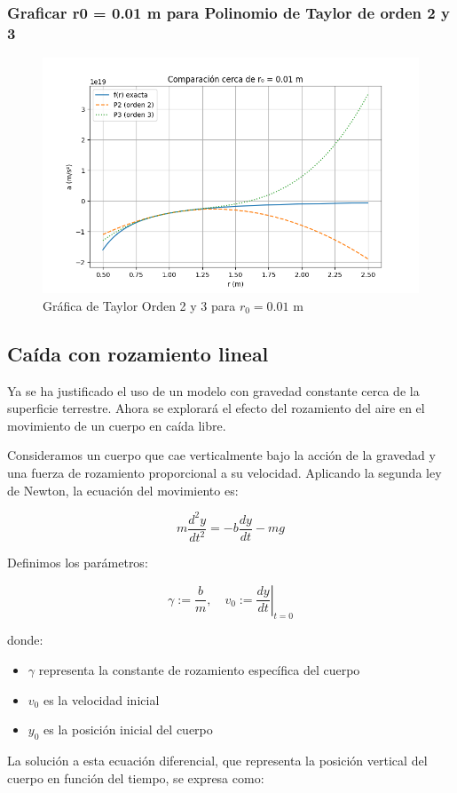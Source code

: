 \documentclass{article}
\begin{document}
\subsubsection{Graficar r0 = 0.01 m para Polinomio de Taylor de orden 2 y 3}

\begin{figure}[H]
    \centering
    \includegraphics[width=1\textwidth]{assets/taylor_orden2y3.png}
    \caption{Gráfica de Taylor Orden 2 y 3 para $r_0 = 0.01$ m}
\end{figure}



\subsection{Caída con rozamiento lineal}
Ya se ha justificado el uso de un modelo con gravedad constante cerca de la superficie terrestre. Ahora se explorará el efecto del rozamiento del aire en el movimiento de un cuerpo en caída libre. 

Consideramos un cuerpo que cae verticalmente bajo la acción de la gravedad y una fuerza de rozamiento proporcional a su velocidad. Aplicando la segunda ley de Newton, la ecuación del movimiento es:

\[
m \frac{d^2y}{dt^2} = -b \frac{dy}{dt} - mg
\]

Definimos los parámetros:

\[
\gamma := \frac{b}{m}, \quad v_0 := \left.\frac{dy}{dt}\right|_{t=0}
\]

donde:
\begin{itemize}
\item \( \gamma \) representa la constante de rozamiento específica del cuerpo
\item \( v_0 \) es la velocidad inicial
\item \( y_0 \) es la posición inicial del cuerpo
\end{itemize}
La solución a esta ecuación diferencial, que representa la posición vertical del cuerpo en función del tiempo, se expresa como:
\end{document}

